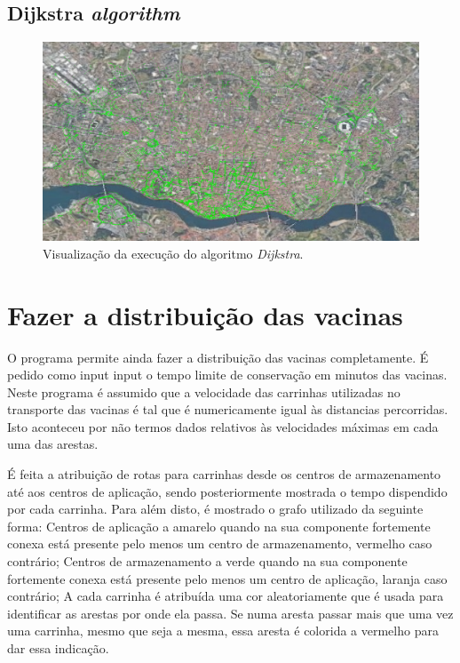 \documentclass[12pt,a4paper]{report}
\begin{document}
\subsection{Dijkstra \textit{algorithm}}

\begin{figure}[H]
	\includegraphics[width=1.0\textwidth]{./imgs/funcs/dijkstra.png}
	\centering
	\caption{Visualização da execução do algoritmo \textit{Dijkstra}.}
\end{figure}


\section{Fazer a distribuição das vacinas}
O programa permite ainda fazer a distribuição das vacinas completamente.
É pedido como input input o tempo limite de conservação em minutos das vacinas. Neste programa é assumido que a velocidade das carrinhas
utilizadas no transporte das vacinas é tal que é numericamente igual às distancias percorridas. Isto aconteceu por não termos dados relativos às velocidades máximas
em cada uma das arestas. \par
É feita a atribuição de rotas para carrinhas desde os centros de armazenamento até aos centros de aplicação,
sendo posteriormente mostrada o tempo dispendido por cada carrinha. Para além disto, é mostrado o grafo utilizado
da seguinte forma: Centros de aplicação a amarelo quando na sua componente fortemente conexa está presente pelo menos um centro de armazenamento, vermelho caso contrário;
Centros de armazenamento a verde quando na sua componente fortemente conexa está presente pelo menos um centro de aplicação, laranja caso contrário;
A cada carrinha é atribuída uma cor aleatoriamente que é usada para identificar as arestas por onde ela passa. 
Se numa aresta passar mais que uma vez uma carrinha, mesmo que seja a mesma, essa aresta é colorida a vermelho para dar essa indicação. \par
\end{document}
